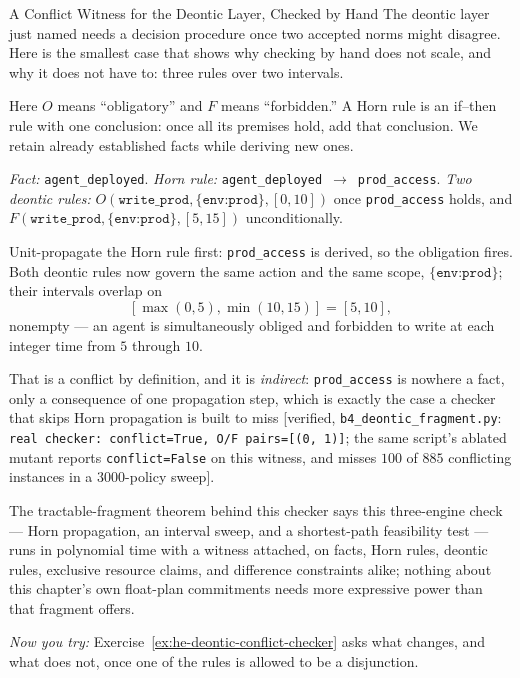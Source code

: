 \documentclass[11pt,a4paper]{article}
\theoremstyle{definition}
\theoremstyle{definition}
\theoremstyle{remark}
\begin{document}
\begin{pdexample}{A Conflict Witness for the Deontic Layer, Checked by Hand}
\setlength{\parskip}{4pt plus 1pt}
The deontic layer just named needs a decision procedure once two accepted norms
might disagree. Here is the smallest case that shows why checking by hand does
not scale, and why it does not have to: three rules over two intervals.

Here $O$ means ``obligatory'' and $F$ means ``forbidden.'' A Horn rule
is an if--then rule with one conclusion: once all its premises hold, add that
conclusion. We retain already established facts while deriving new ones.

\emph{Fact:} \texttt{agent\_deployed}. \emph{Horn rule:}
\texttt{agent\_deployed}~$\to$~\texttt{prod\_access}. \emph{Two deontic rules:}
$O(\texttt{write\_prod},\{\texttt{env:prod}\},[0,10])$ once \texttt{prod\_access}
holds, and $F(\texttt{write\_prod},\{\texttt{env:prod}\},[5,15])$ unconditionally.

Unit-propagate the Horn rule first: \texttt{prod\_access} is derived, so the
obligation fires. Both deontic rules now govern the same action and the same
scope, $\{\texttt{env:prod}\}$; their intervals overlap on
\[
[\max(0,5),\min(10,15)]=[5,10],
\] nonempty --- an agent is simultaneously
obliged and forbidden to write at each integer time from $5$ through $10$.

That is a conflict
by definition, and it is \emph{indirect}: \texttt{prod\_access} is nowhere a
fact, only a consequence of one propagation step, which is exactly the case a
checker that skips Horn propagation is built to miss [verified,
\texttt{b4\_deontic\_fragment.py}: \texttt{real checker: conflict=True, O/F
pairs=[(0, 1)]}; the same script's ablated mutant reports
\texttt{conflict=False} on this witness, and misses $100$ of $885$ conflicting
instances in a $3000$-policy sweep].

The tractable-fragment theorem behind this
checker says this three-engine check --- Horn propagation, an interval sweep,
and a shortest-path feasibility test --- runs in polynomial time with a witness
attached, on facts, Horn rules, deontic rules, exclusive resource claims, and
difference constraints alike; nothing about this chapter's own float-plan
commitments needs more expressive power than that fragment offers.

\emph{Now you try:} Exercise~\ref{ex:he-deontic-conflict-checker} asks what
changes, and what does not, once one of the rules is allowed to be a
disjunction.
\end{pdexample}
\end{document}
